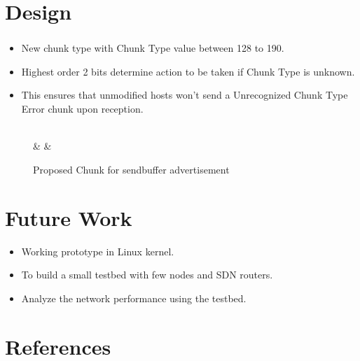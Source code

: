 \documentclass{beamer}
\begin{document}
\section{Design}
\begin{frame}[fragile]
\frametitle{\insertsection}
\begin{itemize}
\item New chunk type with Chunk Type value between 128 to 190.
\item Highest order 2 bits determine action to be taken if Chunk Type is
	unknown.
\item This ensures that unmodified hosts won't send a
	Unrecognized Chunk Type Error chunk upon reception.
\end{itemize}

\begin{figure}[h]
	\centering
	\begin{bytefield}{32}
	\\
	 &  & \\
	\end{bytefield}
	\caption{Proposed Chunk for sendbuffer advertisement}
\end{figure}
\end{frame}

\section{Future Work}
\begin{frame}{\insertsection}
\begin{itemize}
\item Working prototype in Linux kernel.
\item To build a small testbed with few nodes and SDN routers.
\item Analyze the network performance using the testbed.
\end{itemize}
\end{frame}

\section{References}
\begin{frame}[allowframebreaks]
\frametitle<presentation>{\insertsection}
\nocite{*}
\printbibliography
\end{frame}
\end{document}
